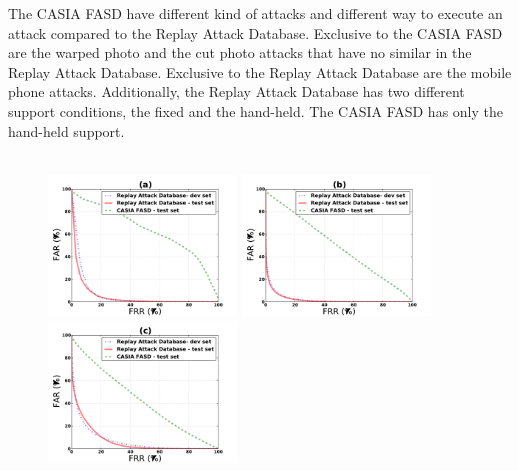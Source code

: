 The CASIA FASD have different kind of attacks and different way to execute an attack compared to the Replay Attack Database. Exclusive to the CASIA FASD are the warped photo and the cut photo attacks that have no similar in the Replay Attack Database. Exclusive to the Replay Attack Database are the mobile phone attacks. Additionally, the Replay Attack Database has two different support conditions, the fixed and the hand-held. The CASIA FASD has only the hand-held support. \\ \\


\begin{figure}[ht]
\begin{center}
\includegraphics [width=5cm] {plots/CROSS-DATABASE/MOTION/roc_replay-machine.pdf} 
\includegraphics [width=5cm] {plots/CROSS-DATABASE/LBPTOP/roc_replay-machine.pdf}
\includegraphics [width=5cm] {plots/CROSS-DATABASE/LBP/roc_replay-machine.pdf}


\end{center}
\end{figure}
